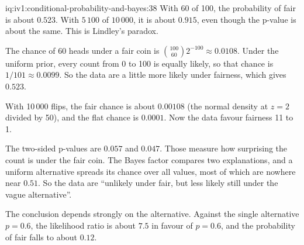 \begin{solution}{iq:iv1:conditional-probability-and-bayes:38}
With 60 of 100, the probability of fair is about $0.523$. With $5\,100$ of $10\,000$, it is about $0.915$, even though the p-value is about the same. This is Lindley's paradox.

The chance of 60 heads under a fair coin is $\binom{100}{60}2^{-100} \approx 0.0108$. Under the uniform prior, every count from 0 to 100 is equally likely, so that chance is $1/101 \approx 0.0099$. So the data are a little more likely under fairness, which gives $0.523$.

With 10\,000 flips, the fair chance is about $0.00108$ (the normal density at $z = 2$ divided by 50), and the flat chance is $0.0001$. Now the data favour fairness 11 to 1.

The two-sided p-values are $0.057$ and $0.047$. Those measure how surprising the count is under the fair coin. The Bayes factor compares two explanations, and a uniform alternative spreads its chance over all values, most of which are nowhere near $0.51$. So the data are ``unlikely under fair, but less likely still under the vague alternative''.

The conclusion depends strongly on the alternative. Against the single alternative $p = 0.6$, the likelihood ratio is about $7.5$ in favour of $p = 0.6$, and the probability of fair falls to about $0.12$.

\end{solution}

